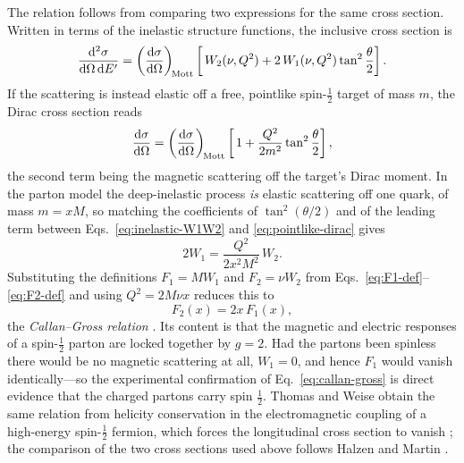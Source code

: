 The relation follows from comparing two expressions for the same cross section. Written
in terms of the inelastic structure functions, the inclusive cross section is
\begin{equation}
    \frac{\mathrm{d}^{2}\sigma}{\mathrm{d}\Omega\,\mathrm{d}E'}
    = \left(\dv{\sigma}{\Omega}\right)_{\!\mathrm{Mott}}
      \left[\,W_{2}(\nu,Q^{2}) + 2\,W_{1}(\nu,Q^{2})\tan^{2}\frac{\theta}{2}\right].
    \label{eq:inelastic-W1W2}
\end{equation}
If the scattering is instead elastic off a free, pointlike spin-$\tfrac{1}{2}$ target of
mass $m$, the Dirac cross section reads
\begin{equation}
    \dv{\sigma}{\Omega}
    = \left(\dv{\sigma}{\Omega}\right)_{\!\mathrm{Mott}}
      \left[\,1 + \frac{Q^{2}}{2m^{2}}\tan^{2}\frac{\theta}{2}\right],
    \label{eq:pointlike-dirac}
\end{equation}
the second term being the magnetic scattering off the target's Dirac moment. In the
parton model the deep-inelastic process \emph{is} elastic scattering off one quark, of
mass $m = xM$, so matching the coefficients of $\tan^{2}(\theta/2)$ and of the leading
term between Eqs.~\eqref{eq:inelastic-W1W2} and \eqref{eq:pointlike-dirac} gives
\begin{equation}
    2W_{1} = \frac{Q^{2}}{2x^{2}M^{2}}\,W_{2}.
    \label{eq:W1W2-matching}
\end{equation}
Substituting the definitions $F_{1}=MW_{1}$ and $F_{2}=\nu W_{2}$ from
Eqs.~\eqref{eq:F1-def}--\eqref{eq:F2-def} and using $Q^{2}=2M\nu x$ reduces this to
\begin{equation}
    F_{2}(x) = 2x\,F_{1}(x),
    \label{eq:callan-gross}
\end{equation}
the \emph{Callan--Gross relation} \cite[Ch.~4.1]{ThomasWeise2001}. Its content is that
the magnetic and electric responses of a spin-$\tfrac12$ parton are locked together by
$g=2$. Had the partons been spinless there would be no magnetic scattering at all,
$W_{1}=0$, and hence $F_{1}$ would vanish identically---so the experimental confirmation
of Eq.~\eqref{eq:callan-gross} is direct evidence that the charged partons carry spin
$\tfrac12$. Thomas and Weise obtain the same relation from helicity conservation in the
electromagnetic coupling of a high-energy spin-$\tfrac12$ fermion, which forces the
longitudinal cross section to vanish \cite[Ch.~4.1]{ThomasWeise2001}; the comparison of
the two cross sections used above follows Halzen and Martin
\cite[Ch.~9]{HalzenMartin1984}.

